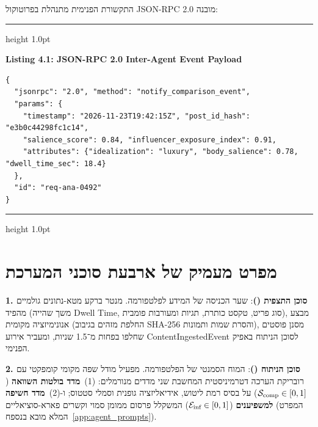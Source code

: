התקשורת הפנימית מתנהלת בפרוטוקול \textenglish{JSON-RPC 2.0} מובנה:

\begin{samepage}
\begin{english}
\par\vspace{0.05cm}\noindent
{\color{LavenderBorder}\hrule height 1.0pt}\vspace{0.05cm}
{\scriptsize\bfseries\color{DarkPurple}\sffamily Listing 4.1: JSON-RPC 2.0 Inter-Agent Event Payload}\par\vspace{0.05cm}
\begin{scriptsize}
\begin{verbatim}
{
  "jsonrpc": "2.0", "method": "notify_comparison_event",
  "params": {
    "timestamp": "2026-11-23T19:42:15Z", "post_id_hash": "e3b0c44298fc1c14",
    "salience_score": 0.84, "influencer_exposure_index": 0.91,
    "attributes": {"idealization": "luxury", "body_salience": 0.78, "dwell_time_sec": 18.4}
  },
  "id": "req-ana-0492"
}
\end{verbatim}
\end{scriptsize}
\vspace{0.05cm}
{\color{LavenderBorder}\hrule height 1.0pt}\vspace{0.10cm}
\end{english}
\end{samepage}

\section{מפרט מעמיק של ארבעת סוכני המערכת}
\label{sec:arch_detailed_agent_specs}
\textbf{1. סוכן התצפית (\agentObserver{})}: שער הכניסה של המידע לפלטפורמה. מנטר ברקע מטא-נתונים גולמיים מהפיד (משך שהייה \textenglish{Dwell Time}, סוג פריט, טקסט כותרת, תגיות ומעורבות פומבית), מבצע אנונימיזציה מקומית (החלפת מזהים בגיבוב \textenglish{SHA-256} והסרת שמות ותמונות), מסנן פוסטים שחלפו בפחות מ־1.5 שניות, ומעביר אירוע \textenglish{ContentIngestedEvent} לסוכן הניתוח באפיק הפנימי.

\textbf{2. סוכן הניתוח (\agentAnalyst{})}: המוח הסמנטי של הפלטפורמה. מפעיל מודל שפה מקומי קומפקטי עם רובריקת הערכה דטרמיניסטית המחשבת שני מדדים מנורמלים: (1)~\textbf{מדד בולטות השוואה} ($\mathcal{S}_{\text{comp}} \in [0, 1]$) על בסיס רמת ליטוש, אידיאליזציה גופנית וסמלי סטטוס; ו-(2)~\textbf{מדד חשיפה למשפיענים} ($\mathcal{E}_{\text{inf}} \in [0, 1]$) המשקלל פרסום ממומן סמוי וקשרים פארא-סוציאליים (המפרט המלא מובא בנספח~\ref{app:agent_prompts}).

